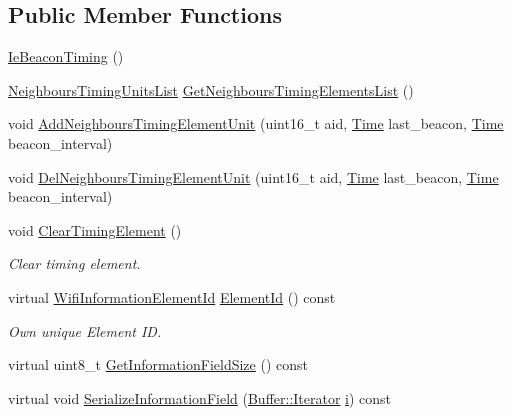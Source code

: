 \subsection*{Public Member Functions}
\begin{DoxyCompactItemize}
\item 
\hyperlink{classns3_1_1dot11s_1_1IeBeaconTiming_a60c0205fdbce78f86823e44ec1243601}{Ie\+Beacon\+Timing} ()
\item 
\hyperlink{group__dot11s_ga8dbec40aea7e1014f0af23de3b31a78c}{Neighbours\+Timing\+Units\+List} \hyperlink{classns3_1_1dot11s_1_1IeBeaconTiming_a94ef69eab1611a070d62ba39875133c8}{Get\+Neighbours\+Timing\+Elements\+List} ()
\item 
void \hyperlink{classns3_1_1dot11s_1_1IeBeaconTiming_a35cd08748c0be3e098a50f4fa870f74f}{Add\+Neighbours\+Timing\+Element\+Unit} (uint16\+\_\+t aid, \hyperlink{classns3_1_1Time}{Time} last\+\_\+beacon, \hyperlink{classns3_1_1Time}{Time} beacon\+\_\+interval)
\item 
void \hyperlink{classns3_1_1dot11s_1_1IeBeaconTiming_afab75d177c576af8f25b62ba19c41511}{Del\+Neighbours\+Timing\+Element\+Unit} (uint16\+\_\+t aid, \hyperlink{classns3_1_1Time}{Time} last\+\_\+beacon, \hyperlink{classns3_1_1Time}{Time} beacon\+\_\+interval)
\item 
void \hyperlink{classns3_1_1dot11s_1_1IeBeaconTiming_a5f2c03cd3439040f1838a8d197bf8dfa}{Clear\+Timing\+Element} ()
\begin{DoxyCompactList}\small\item\em Clear timing element. \end{DoxyCompactList}\item 
virtual \hyperlink{namespacens3_aeb185e0c8a60816016bca079f1420478}{Wifi\+Information\+Element\+Id} \hyperlink{classns3_1_1dot11s_1_1IeBeaconTiming_a33f8affee15aecca58e7562554de6eff}{Element\+Id} () const 
\begin{DoxyCompactList}\small\item\em Own unique Element ID. \end{DoxyCompactList}\item 
virtual uint8\+\_\+t \hyperlink{classns3_1_1dot11s_1_1IeBeaconTiming_af06044ad26427932bd523508c2fd8bad}{Get\+Information\+Field\+Size} () const 
\item 
virtual void \hyperlink{classns3_1_1dot11s_1_1IeBeaconTiming_adb0b280c030851b413eec4df6ec4e0a9}{Serialize\+Information\+Field} (\hyperlink{classns3_1_1Buffer_1_1Iterator}{Buffer\+::\+Iterator} \hyperlink{lte__uplink__power__control_8m_a6f6ccfcf58b31cb6412107d9d5281426}{i}) const 

\end{DoxyCompactItemize}
